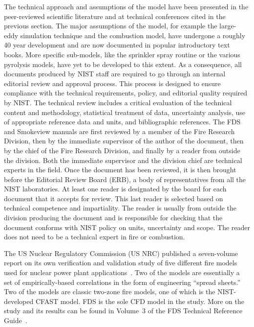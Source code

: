 \documentclass[11pt]{book}
\begin{document}
The technical approach and assumptions of the model have been presented in the peer-reviewed scientific literature and at technical conferences cited in the previous section. The major assumptions of the model, for example the large-eddy simulation technique and the combustion model, have undergone a roughly 40 year development and are now documented in popular introductory text books. More specific sub-models, like the sprinkler spray routine or the various pyrolysis models, have yet to be developed to this extent. As a consequence, all documents produced by NIST staff are required to go through an internal editorial review and approval process. This process is designed to ensure compliance with the technical requirements, policy, and editorial quality required by NIST. The technical review includes a critical evaluation of the technical content and methodology, statistical treatment of data, uncertainty analysis, use of appropriate reference data and units, and bibliographic references. The FDS and Smokeview manuals are first reviewed by a member of the Fire Research Division, then by the immediate supervisor of the author of the document, then by the chief of the Fire Research Division, and finally by a reader from outside the division. Both the immediate supervisor and the division
chief are technical experts in the field. Once the document has been reviewed, it is then brought before the Editorial Review Board (ERB), a body of representatives from all the NIST laboratories. At least one reader is designated by the board for each document that it accepts for review. This last reader is selected based on technical competence and impartiality. The reader is usually from outside the division producing the document and is responsible for checking that the document conforms with NIST policy on units, uncertainty and scope. The reader does not need to be a technical expert in fire or combustion.

The US Nuclear Regulatory Commission (US NRC) published a seven-volume report on its own verification and validation study of five different fire models used for nuclear power plant applications~\cite{NUREG_1824}. Two of the models are essentially a set of empirically-based correlations in the form of engineering ``spread sheets.'' Two of the models are classic two-zone fire models, one of which is the NIST-developed CFAST model. FDS is the sole CFD model in the study. More on the study and its results can be found in Volume~3 of the FDS Technical Reference Guide~\cite{FDS_Tech_Guide}.
\end{document}
